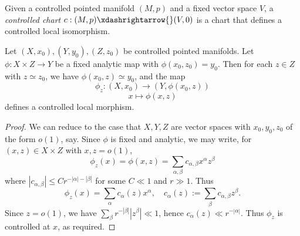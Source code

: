 \begin{definition}
  Given a controlled pointed manifold $(M,p)$ and a fixed vector space $V$, a \emph{controlled chart} $c : (M,p) \xdashrightarrow{} (V,0)$ is a chart that defines a controlled local isomorphism.
\end{definition}

\begin{lemma}\label{lem:families-controlled-maps}
  Let $(X,x_0),(Y,y_0),(Z,z_0)$ be controlled pointed manifolds.  Let $\phi : X \times Z \rightarrow Y$ be a fixed analytic map with $\phi(x_0,z_0) = y_0$.  Then for each $z \in Z$ with $z \simeq z_0$, we have $\phi(x_0,z) \simeq y_0$, and the map
  \begin{equation*}
    \phi_z : (X,x_0) \rightarrow (Y,\phi(x_0,z))
  \end{equation*}
  \begin{equation*}
    x \mapsto \phi(x,z)
  \end{equation*}
  defines a controlled local morphism.
\end{lemma}
\begin{proof}
  We can reduce to the case that $X,Y,Z$ are vector spaces with $x_0,y_0,z_0$ of the form $o(1)$, say.  Since $\phi$ is fixed and analytic, we may write, for $(x,z) \in X \times Z$ with $x,z = o(1)$,
  \begin{equation*}
    \phi_z(x) = \phi(x,z) = \sum_{\alpha,\beta} c_{\alpha,\beta} x^\alpha z^\beta
  \end{equation*}
  where $|c_{\alpha, \beta}| \leq C r^{-|\alpha| - |\beta|}$ for some $C \ll 1$ and $r \gg 1$.  Thus
  \begin{equation*}
    \phi_z(x) = \sum_{\alpha} c_\alpha(z) x^\alpha, \quad
    c_\alpha(z) := \sum_{\beta} c_{\alpha,\beta} z^\beta.
  \end{equation*}
  Since $z = o(1)$, we have $\sum_{\beta} r^{-|\beta|} |z^\beta| \ll 1$, hence $c_\alpha(z) \ll r^{-|\alpha|}$.  Thus $\phi_z$ is controlled at $x$, as required.
\end{proof}

